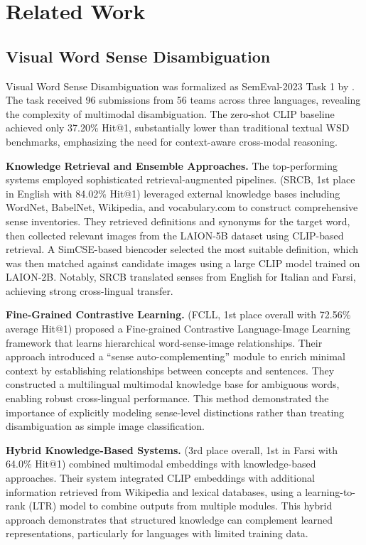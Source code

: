 \documentclass[11pt]{article}
\begin{document}
\section{Related Work}
\label{sec:related}

\subsection{Visual Word Sense Disambiguation}

Visual Word Sense Disambiguation was formalized as SemEval-2023 Task 1 by \citet{raganato2023semeval}. The task received 96 submissions from 56 teams across three languages, revealing the complexity of multimodal disambiguation. The zero-shot CLIP baseline achieved only 37.20\% Hit@1, substantially lower than traditional textual WSD benchmarks, emphasizing the need for context-aware cross-modal reasoning.

\textbf{Knowledge Retrieval and Ensemble Approaches.} The top-performing systems employed sophisticated retrieval-augmented pipelines. \citet{zhang2023srcb} (SRCB, 1st place in English with 84.02\% Hit@1) leveraged external knowledge bases including WordNet, BabelNet, Wikipedia, and vocabulary.com to construct comprehensive sense inventories. They retrieved definitions and synonyms for the target word, then collected relevant images from the LAION-5B dataset using CLIP-based retrieval. A SimCSE-based biencoder selected the most suitable definition, which was then matched against candidate images using a large CLIP model trained on LAION-2B. Notably, SRCB translated senses from English for Italian and Farsi, achieving strong cross-lingual transfer.

\textbf{Fine-Grained Contrastive Learning.} \citet{yang2023fcll} (FCLL, 1st place overall with 72.56\% average Hit@1) proposed a Fine-grained Contrastive Language-Image Learning framework that learns hierarchical word-sense-image relationships. Their approach introduced a ``sense auto-complementing'' module to enrich minimal context by establishing relationships between concepts and sentences. They constructed a multilingual multimodal knowledge base for ambiguous words, enabling robust cross-lingual performance. This method demonstrated the importance of explicitly modeling sense-level distinctions rather than treating disambiguation as simple image classification.

\textbf{Hybrid Knowledge-Based Systems.} \citet{dadas2023opi} (3rd place overall, 1st in Farsi with 64.0\% Hit@1) combined multimodal embeddings with knowledge-based approaches. Their system integrated CLIP embeddings with additional information retrieved from Wikipedia and lexical databases, using a learning-to-rank (LTR) model to combine outputs from multiple modules. This hybrid approach demonstrates that structured knowledge can complement learned representations, particularly for languages with limited training data.
\end{document}
